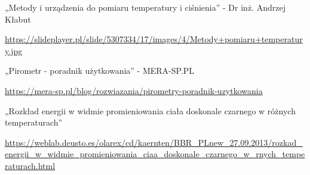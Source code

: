 \cleardoublepage
{}
{}
\begin{thebibliography}{999}
\begin{spacing}{1}


    





    

     „Metody i urządzenia do pomiaru temperatury i ciśnienia” - Dr inż. Andrzej Kłabut

    \url{https://slideplayer.pl/slide/5307334/17/images/4/Metody+pomiaru+temperatury.jpg}

     „Pirometr - poradnik użytkowania” - MERA-SP.PL

    \url{https://mera-sp.pl/blog/rozwiazania/pirometry-poradnik-uzytkowania}

     „Rozkład energii w widmie promieniowania ciała doskonale czarnego w różnych temperaturach”

    \url{https://weblab.deusto.es/olarex/cd/kaernten/BBR_PLnew_27.09.2013/rozkad_energii_w_widmie_promieniowania_ciaa_doskonale_czarnego_w_rnych_temperaturach.html}

\end{spacing}
\end{thebibliography}